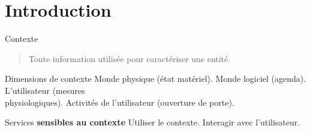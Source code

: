 \section*{Introduction}
\begin{frame}{Contexte}
  \begin{small}
    \begin{quote}
      Toute information utilisée pour caractériser une entité. 
    \end{quote}
  \end{small}
\vfill

  \begin{minipage}{.48\linewidth}
\begin{coloredbox}[black]{Dimensions de contexte}
     Monde physique (état matériel). %
\vfill
     Monde logiciel (agenda).
\vfill
     L'utilisateur (mesures \\physiologiques).
\vfill
     Activités de l'utilisateur (ouverture de porte).
\end{coloredbox}
  \end{minipage}
  \hfill
  \begin{minipage}{.48\linewidth}
\begin{coloredbox}[black]{ Services \textbf{sensibles au contexte}}
    Utiliser le contexte. 
    \vfill 
    Interagir avec l'utilisateur.
\end{coloredbox}
  \end{minipage}
\end{frame}


